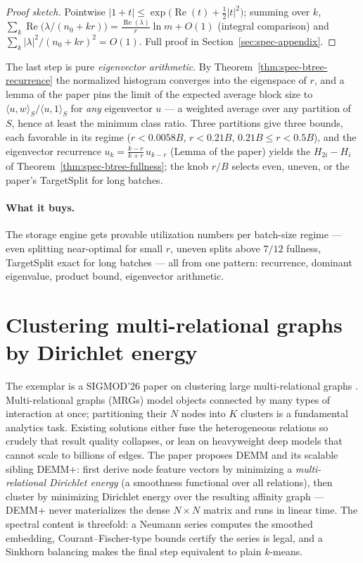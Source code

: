 \begin{proof}[Proof sketch]
Pointwise $|1+t| \le \exp\!\bigl(\operatorname{Re}(t) + \tfrac{1}{2}|t|^2
\bigr)$; summing over $k$, $\sum_k \operatorname{Re}\bigl(\lambda/(n_0+kr)
\bigr) = \frac{\operatorname{Re}(\lambda)}{r}\ln m + O(1)$ (integral
comparison) and $\sum_k |\lambda|^2/(n_0+kr)^2 = O(1)$. Full proof in
Section~\ref{sec:spec-appendix}.
\end{proof}

The last step is pure \emph{eigenvector arithmetic}. By
Theorem~\ref{thm:spec-btree-recurrence} the normalized histogram converges
into the eigenspace of $r$, and a lemma of the paper pins the limit of the
expected average block size to $\langle u, w\rangle_S / \langle u,
1\rangle_S$ for \emph{any} eigenvector $u$ --- a weighted average over any
partition of $S$, hence at least the minimum class ratio. Three partitions
give three bounds, each favorable in its regime ($r < 0.0058B$, $r < 0.21B$,
$0.21B \le r < 0.5B$), and the eigenvector recurrence $u_k =
\frac{k-r}{k+r}\,u_{k-r}$ (Lemma of the paper) yields the $H_{2i} - H_i$ of
Theorem~\ref{thm:spec-btree-fullness}; the knob $r/B$ selects even, uneven,
or the paper's TargetSplit for long batches.

\paragraph{What it buys.}
The storage engine gets provable utilization numbers per batch-size regime
--- even splitting near-optimal for small $r$, uneven splits above $7/12$ fullness, TargetSplit exact for long batches --- all from one pattern:
recurrence, dominant eigenvalue, product bound, eigenvector arithmetic.

\section{Clustering multi-relational graphs by Dirichlet energy}
\label{sec:spec-mrg}

The exemplar is a SIGMOD'26 paper on clustering large multi-relational graphs
\citep{sigmod26-303}. Multi-relational graphs (MRGs) model objects connected
by many types of interaction at once; partitioning their $N$ nodes into $K$
clusters is a fundamental analytics task. Existing solutions either fuse
the heterogeneous relations so crudely that result quality collapses, or
lean on heavyweight deep models that cannot scale to billions of edges. The
paper proposes DEMM and its scalable sibling DEMM+: first derive node
feature vectors by minimizing a \emph{multi-relational Dirichlet energy}
(a smoothness functional over all relations), then cluster by minimizing
Dirichlet energy over the resulting affinity graph --- DEMM+ never
materializes the dense $N \times N$ matrix and runs in linear time. The
spectral content is threefold: a Neumann series computes the smoothed
embedding, Courant--Fischer-type bounds certify the series is legal, and a
Sinkhorn balancing makes the final step equivalent to plain $k$-means.

